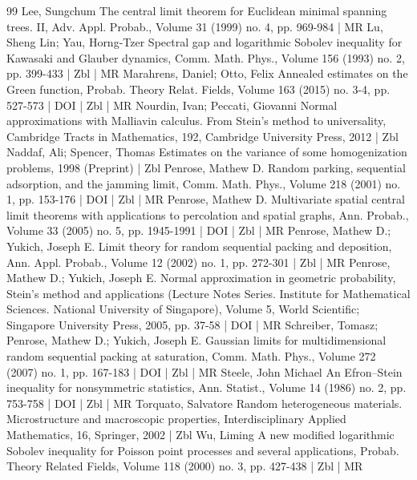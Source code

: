 \documentclass[10pt]{amsart}
\theoremstyle{definition}\newtheorem{defi}[theo]{Definition}\newtheorem{rema}[theo]{Remark}\newtheorem{exam}[theo]{Example}\newtheorem{exem}[theo]{Example}\newtheorem{nota}[theo]{Notation}
\begin{document}
\begin{thebibliography}{99}
Lee, Sungchum The central limit theorem for Euclidean minimal spanning trees. II, Adv. Appl. Probab., Volume 31 (1999) no. 4, pp. 969-984 | MR
Lu, Sheng Lin; Yau, Horng-Tzer Spectral gap and logarithmic Sobolev inequality for Kawasaki and Glauber dynamics, Comm. Math. Phys., Volume 156 (1993) no. 2, pp. 399-433 | Zbl | MR
Marahrens, Daniel; Otto, Felix Annealed estimates on the Green function, Probab. Theory Relat. Fields, Volume 163 (2015) no. 3-4, pp. 527-573 | DOI | Zbl | MR
Nourdin, Ivan; Peccati, Giovanni Normal approximations with Malliavin calculus. From Stein’s method to universality, Cambridge Tracts in Mathematics, 192, Cambridge University Press, 2012 | Zbl
Naddaf, Ali; Spencer, Thomas Estimates on the variance of some homogenization problems, 1998 (Preprint) | Zbl
Penrose, Mathew D. Random parking, sequential adsorption, and the jamming limit, Comm. Math. Phys., Volume 218 (2001) no. 1, pp. 153-176 | DOI | Zbl | MR
Penrose, Mathew D. Multivariate spatial central limit theorems with applications to percolation and spatial graphs, Ann. Probab., Volume 33 (2005) no. 5, pp. 1945-1991 | DOI | Zbl | MR
Penrose, Mathew D.; Yukich, Joseph E. Limit theory for random sequential packing and deposition, Ann. Appl. Probab., Volume 12 (2002) no. 1, pp. 272-301 | Zbl | MR
Penrose, Mathew D.; Yukich, Joseph E. Normal approximation in geometric probability, Stein’s method and applications (Lecture Notes Series. Institute for Mathematical Sciences. National University of Singapore), Volume 5, World Scientific; Singapore University Press, 2005, pp. 37-58 | DOI | MR
Schreiber, Tomasz; Penrose, Mathew D.; Yukich, Joseph E. Gaussian limits for multidimensional random sequential packing at saturation, Comm. Math. Phys., Volume 272 (2007) no. 1, pp. 167-183 | DOI | Zbl | MR
Steele, John Michael An Efron–Stein inequality for nonsymmetric statistics, Ann. Statist., Volume 14 (1986) no. 2, pp. 753-758 | DOI | Zbl | MR
Torquato, Salvatore Random heterogeneous materials. Microstructure and macroscopic properties, Interdisciplinary Applied Mathematics, 16, Springer, 2002 | Zbl
Wu, Liming A new modified logarithmic Sobolev inequality for Poisson point processes and several applications, Probab. Theory Related Fields, Volume 118 (2000) no. 3, pp. 427-438 | Zbl | MR
\end{thebibliography}
\end{document}
